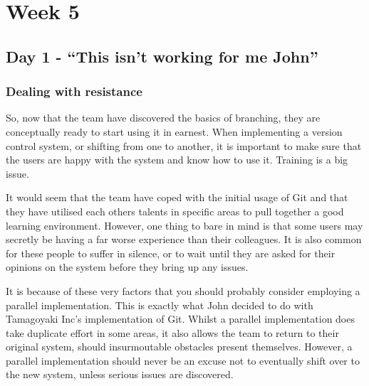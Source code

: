 \cleardoublepage
\chapter{Week 5}

\section{Day 1 - ``This isn't working for me John''}
\subsection{Dealing with resistance}

So, now that the team have discovered the basics of branching, they are conceptually ready to start using it in earnest.  When implementing a version control system, or shifting from one to another, it is important to make sure that the users are happy with the system and know how to use it.  Training is a big issue.

It would seem that the team have coped with the initial usage of Git and that they have utilised each others talents in specific areas to pull together a good learning environment.  However, one thing to bare in mind is that some users may secretly be having a far worse experience than their colleagues.  It is also common for these people to suffer in silence, or to wait until they are asked for their opinions on the system before they bring up any issues.

It is because of these very factors that you should probably consider employing a parallel implementation.  This is exactly what John decided to do with Tamagoyaki Inc's implementation of Git.  Whilst a parallel implementation does take duplicate effort in some areas, it also allows the team to return to their original system, should insurmoutable obstacles present themselves.  However, a parallel implementation should never be an excuse not to eventually shift over to the new system, unless serious issues are discovered.

